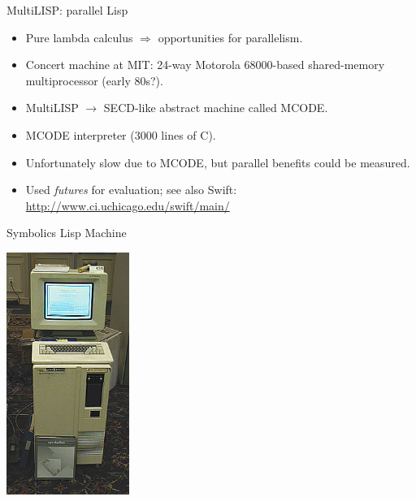 \documentclass[professionalFonts]{beamer}
\begin{document}
\begin{frame}

MultiLISP: parallel Lisp

\begin{itemize}

\item Pure lambda calculus $\Rightarrow$ opportunities for parallelism.

\item Concert machine at MIT: 24-way Motorola 68000-based shared-memory multiprocessor (early 80s?).

\item MultiLISP $\rightarrow$ SECD-like abstract machine called MCODE.

\item MCODE interpreter (3000 lines of C).

\item Unfortunately slow due to MCODE, but parallel benefits could be measured.

\item Used {\it futures} for evaluation; see also Swift: \url{http://www.ci.uchicago.edu/swift/main/}

\end{itemize}


\end{frame}

\begin{frame}

Symbolics Lisp Machine

\begin{center}
\includegraphics[width=4cm]{220px-Symbolics3640_Modified.JPG}
\end{center}





\end{frame}
\end{document}
